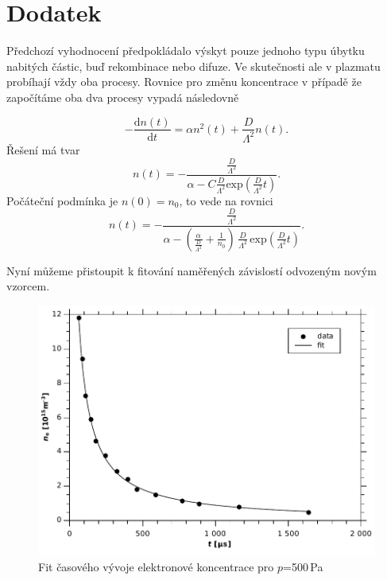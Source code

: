 \documentclass[12pt]{article}
\begin{document}
\section{Dodatek}
Předchozí vyhodnocení předpokládalo výskyt pouze jednoho typu úbytku nabitých částic, buď rekombinace nebo difuze. Ve skutečnosti ale v plazmatu probíhají vždy oba procesy. Rovnice pro změnu koncentrace v případě že započítáme oba dva procesy vypadá následovně

\begin{equation}
-\frac{\mathrm{d}n(t)}{\mathrm{d}t} = \alpha n^2(t) + \frac{D}{\Lambda^2}n(t) \mathrm{.}
\end{equation}
Řešení má tvar
\begin{equation}
n(t)=  -\frac{ \frac{D}{\Lambda^2} }{ \alpha - C \frac{D}{\Lambda^2} \mathrm{exp}(\frac{D}{\Lambda^2} t) } \mathrm{.}
\end{equation}
Počáteční podmínka je $n(0) = n_0$, to vede na rovnici
\begin{equation}
n(t)=  -\frac{ \frac{D}{\Lambda^2} }{ \alpha - (\frac{\alpha}{\frac{D}{\Lambda^2}} + \frac{1}{n_0})\, \frac{D}{\Lambda^2} \,\mathrm{exp}(\frac{D}{\Lambda^2} t ) } \mathrm{.}
\end{equation}

Nyní můžeme přistoupit k fitování naměřených závislostí odvozeným novým vzorcem.

\begin{figure}[htbp]
\begin{center}
\includegraphics[width=13cm]{fit500pa.pdf}
\caption{Fit časového vývoje elektronové koncentrace pro $p$=500\,Pa}
\label{fit500}
\end{center}
\end{figure}
\end{document}
